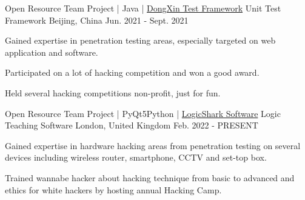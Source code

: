 

\begin{cventries}

  \cventry
    {Open Resource Team Project | Java | \href{https://github.com/jerryyangboyu/dongxin-test-framework}{\faGithubSquare\acvHeaderIconSep DongXin Test Framework}}
    {Unit Test Framework} %
    {Beijing, China} %
    {Jun. 2021 - Sept. 2021} %
    {
      \begin{cvitems} %
        \item {Gained expertise in penetration testing areas, especially targeted on web application and software.}
        \item {Participated on a lot of hacking competition and won a good award.}
        \item {Held several hacking competitions non-profit, just for fun.}
      \end{cvitems}
    }

  \cventry
    {Open Resource Team Project | PyQt5\acvHeaderIconSep\bullet\acvHeaderIconSep Python | \href{https://github.com/jerryyangboyu/LogicShark}{\faGithubSquare\acvHeaderIconSep LogicShark Software}}
    {Logic Teaching Software} %
    {London, United Kingdom} %
    {Feb. 2022 - PRESENT} %
    {
      \begin{cvitems} %
        \item {Gained expertise in hardware hacking areas from penetration testing on several devices including wireless router, smartphone, CCTV and set-top box.}
        \item {Trained wannabe hacker about hacking technique from basic to advanced and ethics for white hackers by hosting annual Hacking Camp.}
      \end{cvitems}
    }


\end{cventries}
